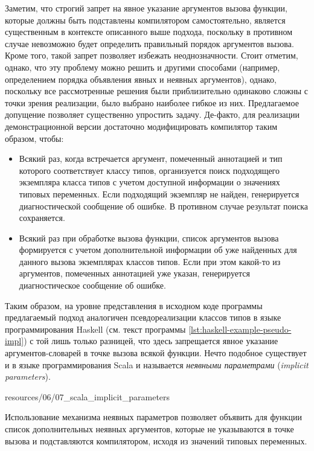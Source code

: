 Заметим, что строгий запрет на явное указание аргументов вызова функции, которые должны быть подставлены компилятором самостоятельно, является существенным в контексте описанного выше подхода, поскольку в противном случае невозможно будет определить правильный порядок аргументов вызова. Кроме того, такой запрет позволяет избежать неоднозначности. Стоит отметим, однако, что эту проблему можно решить и другими способами (например, определением порядка объявления явных и неявных аргументов), однако, поскольку все рассмотренные решения были приблизительно одинаково сложны с точки зрения реализации, было выбрано наиболее гибкое из них. Предлагаемое допущение позволяет существенно упростить задачу. Де-факто, для реализации демонстрационной версии достаточно модифицировать компилятор таким образом, чтобы:
\begin{itemize}
    \item Всякий раз, когда встречается аргумент, помеченный аннотацией  и тип которого соответствует классу типов, организуется поиск подходящего экземпляра класса типов с учетом доступной информации о значениях типовых переменных. Если подходящий экземпляр не найден, генерируется диагностической сообщение об ошибке. В противном случае результат поиска сохраняется.
    \item Всякий раз при обработке вызова функции, список аргументов вызова формируется с учетом дополнительной информации об уже найденных для данного вызова экземплярах классов типов. Если при этом какой-то из аргументов, помеченных аннотацией  уже указан, генерируется диагностическое сообщение об ошибке.
\end{itemize}
Таким образом, на уровне представления в исходном коде программы предлагаемый подход аналогичен псевдореализации классов типов в языке программирования Haskell (см. текст программы \ref{lst:haskell-example-pseudo-impl}) с той лишь только разницей, что здесь запрещается явное указание аргументов-словарей в точке вызова всякой функции. Нечто подобное существует и в языке программирования Scala и называется \emph{неявными параметрами} (\emph{implicit parameters}). 


{resources/06/07_scala_implicit_parameters}

Использование механизма неявных параметров позволяет объявить для функции список дополнительных неявных аргументов, которые не указываются в точке вызова и подставляются компилятором, исходя из значений типовых переменных.

